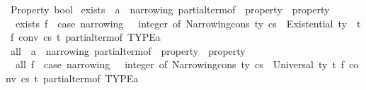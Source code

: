 \begin{isabellebody}
{\isacharbar}{\kern0pt}\ Property\ bool\isanewline
\isanewline
\isanewline
{}\isamarkupfalse%
\ exists\ {\isacharcolon}{\kern0pt}{\isacharcolon}{\kern0pt}\ {\isachardoublequoteopen}{\isacharparenleft}{\kern0pt}{\isacharprime}{\kern0pt}a\ {\isacharcolon}{\kern0pt}{\isacharcolon}{\kern0pt}\ {\isacharbraceleft}{\kern0pt}narrowing{\isacharcomma}{\kern0pt}\ partial{\isacharunderscore}{\kern0pt}term{\isacharunderscore}{\kern0pt}of{\isacharbraceright}{\kern0pt}\ {\isacharequal}{\kern0pt}{\isachargreater}{\kern0pt}\ property{\isacharparenright}{\kern0pt}\ {\isacharequal}{\kern0pt}{\isachargreater}{\kern0pt}\ property{\isachardoublequoteclose}\isanewline
{}\isanewline
\ \ {\isachardoublequoteopen}exists\ f\ {\isacharequal}{\kern0pt}\ {\isacharparenleft}{\kern0pt}case\ narrowing\ {\isacharparenleft}{\kern0pt}{}{}{}\ {\isacharcolon}{\kern0pt}{\isacharcolon}{\kern0pt}\ integer{\isacharparenright}{\kern0pt}\ of\ Narrowing{\isacharunderscore}{\kern0pt}cons\ ty\ cs\ {\isasymRightarrow}\ Existential\ ty\ {\isacharparenleft}{\kern0pt}{\isasymlambda}\ t{\isachardot}{\kern0pt}\ f\ {\isacharparenleft}{\kern0pt}conv\ cs\ t{\isacharparenright}{\kern0pt}{\isacharparenright}{\kern0pt}\ {\isacharparenleft}{\kern0pt}partial{\isacharunderscore}{\kern0pt}term{\isacharunderscore}{\kern0pt}of\ {\isacharparenleft}{\kern0pt}TYPE{\isacharparenleft}{\kern0pt}{\isacharprime}{\kern0pt}a{\isacharparenright}{\kern0pt}{\isacharparenright}{\kern0pt}{\isacharparenright}{\kern0pt}{\isacharparenright}{\kern0pt}{\isachardoublequoteclose}\isanewline
\isanewline
{}\isamarkupfalse%
\ {\isachardoublequoteopen}all{\isachardoublequoteclose}\ {\isacharcolon}{\kern0pt}{\isacharcolon}{\kern0pt}\ {\isachardoublequoteopen}{\isacharparenleft}{\kern0pt}{\isacharprime}{\kern0pt}a\ {\isacharcolon}{\kern0pt}{\isacharcolon}{\kern0pt}\ {\isacharbraceleft}{\kern0pt}narrowing{\isacharcomma}{\kern0pt}\ partial{\isacharunderscore}{\kern0pt}term{\isacharunderscore}{\kern0pt}of{\isacharbraceright}{\kern0pt}\ {\isacharequal}{\kern0pt}{\isachargreater}{\kern0pt}\ property{\isacharparenright}{\kern0pt}\ {\isacharequal}{\kern0pt}{\isachargreater}{\kern0pt}\ property{\isachardoublequoteclose}\isanewline
{}\isanewline
\ \ {\isachardoublequoteopen}all\ f\ {\isacharequal}{\kern0pt}\ {\isacharparenleft}{\kern0pt}case\ narrowing\ {\isacharparenleft}{\kern0pt}{}{}{}\ {\isacharcolon}{\kern0pt}{\isacharcolon}{\kern0pt}\ integer{\isacharparenright}{\kern0pt}\ of\ Narrowing{\isacharunderscore}{\kern0pt}cons\ ty\ cs\ {\isasymRightarrow}\ Universal\ ty\ {\isacharparenleft}{\kern0pt}{\isasymlambda}t{\isachardot}{\kern0pt}\ f\ {\isacharparenleft}{\kern0pt}conv\ cs\ t{\isacharparenright}{\kern0pt}{\isacharparenright}{\kern0pt}\ {\isacharparenleft}{\kern0pt}partial{\isacharunderscore}{\kern0pt}term{\isacharunderscore}{\kern0pt}of\ {\isacharparenleft}{\kern0pt}TYPE{\isacharparenleft}{\kern0pt}{\isacharprime}{\kern0pt}a{\isacharparenright}{\kern0pt}{\isacharparenright}{\kern0pt}{\isacharparenright}{\kern0pt}{\isacharparenright}{\kern0pt}{\isachardoublequoteclose}%

\end{isabellebody}
